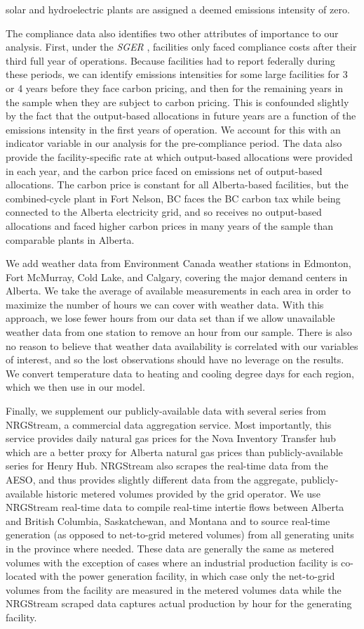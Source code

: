 \documentclass[12pt]{article}
\newcommand{\SGER}{\textit{SGER} }
\begin{document}
solar and hydroelectric plants are assigned a deemed emissions intensity of zero.

The compliance data also identifies two other attributes of importance to our analysis. First, under the \SGER, facilities only faced compliance costs after their third full year of operations. Because facilities had to report federally during these periods, we can identify emissions intensities for some large facilities for 3 or 4 years before they face carbon pricing, and then for the remaining years in the sample when they are subject to carbon pricing. This is confounded slightly by the fact that the output-based allocations in future years are a function of the emissions intensity in the first years of operation. We account for this with an indicator variable in our analysis for the pre-compliance period. The data also provide the facility-specific rate at which output-based allocations were provided in each year, and the carbon price faced on emissions net of output-based allocations. The carbon price is constant for all Alberta-based facilities, but the combined-cycle plant in Fort Nelson, BC faces the BC carbon tax while being connected to the Alberta electricity grid, and so receives no output-based allocations and faced higher carbon prices in many years of the sample than comparable plants in Alberta.

We add weather data from Environment Canada weather stations in Edmonton, Fort McMurray, Cold Lake, and Calgary, covering the major demand centers in Alberta.  We take the average of available measurements in each area in order to maximize the number of hours we can cover with weather data. With this approach, we lose fewer hours from our data set than if we allow unavailable weather data from one station to remove an hour from our sample. There is also no reason to believe that weather data availability is correlated with our variables of interest, and so the lost observations should have no leverage on the results. We convert temperature data to heating and cooling degree days for each region, which we then use in our model.

Finally, we supplement our publicly-available data with several series from NRGStream, a commercial data aggregation service. Most importantly, this service provides daily natural gas prices for the Nova Inventory Transfer hub which are a better proxy for Alberta natural gas prices than publicly-available series for Henry Hub. NRGStream also scrapes the real-time data from the AESO, and thus provides slightly different data from the aggregate, publicly-available historic metered volumes provided by the grid operator. We use NRGStream real-time data to compile real-time intertie flows between Alberta and British Columbia, Saskatchewan, and Montana and to source real-time generation (as opposed to net-to-grid metered volumes) from all generating units in the province where needed. These data are generally the same as metered volumes with the exception of cases where an industrial production facility is co-located with the power generation facility, in which case only the net-to-grid volumes from the facility are measured in the metered volumes data while the NRGStream scraped data captures actual production by hour for the generating facility.
\end{document}
